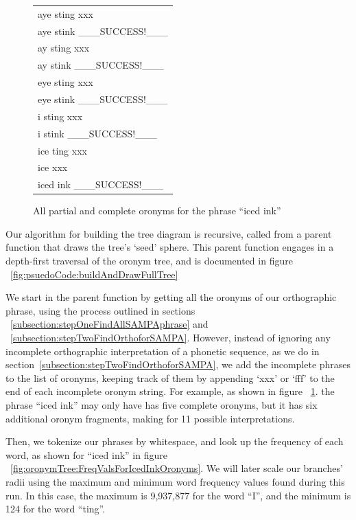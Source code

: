 \begin{figure}
\begin{center}
\begin{tabular}{|l|}
\hline
aye sting xxx \\
aye stink \_\_\_SUCCESS!\_\_\_ \\
ay sting xxx \\
ay stink \_\_\_SUCCESS!\_\_\_ \\
eye sting xxx \\
eye stink  \_\_\_SUCCESS!\_\_\_ \\
i sting xxx \\
i stink \_\_\_SUCCESS!\_\_\_ \\
ice ting xxx \\
ice xxx \\
iced ink \_\_\_SUCCESS!\_\_\_ \\
\hline
\end{tabular}
\captionfonts
\caption[IcedInkOronymsWithPartials]{All partial and complete oronyms for the phrase ``iced ink''}
\label{fig:oronymTree:IcedInkOronyms}
\end{center}
\end{figure}

Our algorithm for building the tree diagram is recursive, called from a parent function that draws the tree's `seed' sphere. This parent function engages in a depth-first traversal of the oronym tree, and is documented in figure ~\ref{fig:psuedoCode:buildAndDrawFullTree}


We start in the parent function by getting all the oronyms of our orthographic phrase, using the process outlined in sections  ~\ref{subsection:stepOneFindAllSAMPAphrase} and ~\ref{subsection:stepTwoFindOrthoforSAMPA}.  However, instead of ignoring any incomplete orthographic interpretation of a phonetic sequence, as we do in section~\ref{subsection:stepTwoFindOrthoforSAMPA}, we add the incomplete phrases to the list of oronyms, keeping track of them by appending `xxx' or `fff' to the end of each incomplete oronym string. For example, as shown in figure ~\ref{fig:oronymTree:IcedInkOronyms}. the phrase ``iced ink'' may only have has five complete oronyms, but it has six additional oronym fragments, making for 11 possible interpretations.   


Then, we tokenize our phrases by whitespace, and look up the frequency of each word, as shown for ``iced ink'' in figure ~\ref{fig:oronymTree:FreqValsForIcedInkOronyms}.  We will later scale our branches' radii using the maximum and minimum word frequency values found during this run. In this case, the maximum is 9,937,877 for the word ``I'', and the minimum is 124 for the word ``ting''.

